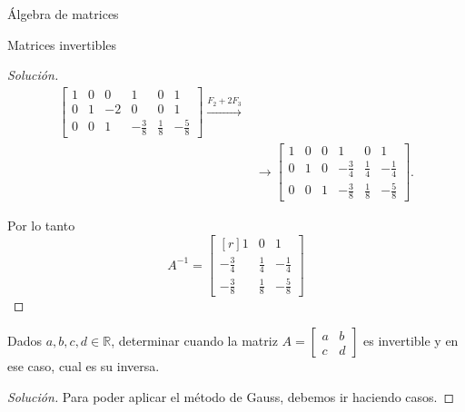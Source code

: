 \begin{chapter}{\'Algebra de matrices}
\begin{section}{Matrices invertibles}
\begin{proof}[Solución]
\begin{align*}
                \left[\begin{array}{rrr|rrr}    1&0&0&1&0&1\\ 0&1&-2&0&0&1 \\ 0&0&1&-\frac38&\frac18&-\frac58 \end{array}\right]
                \stackrel{F_2+2F_3}{\longrightarrow} \\
                &\longrightarrow
                \left[\begin{array}{rrr|rrr}    1&0&0&1&0&1\\ 0&1&0&-\frac34&\frac14&-\frac14 \\ 0&0&1&-\frac38&\frac18&-\frac58 \end{array}\right].
                \end{align*}
                
                Por lo tanto 
                \begin{equation*}
                A^{-1} =     \begin{bmatrix*}[r]    1&0&1\\ -\frac34&\frac14&-\frac14 \\ -\frac38&\frac18&-\frac58 \end{bmatrix*}
                \end{equation*}
            \end{proof}
            
            \begin{ejemplo*}\label{inv-2x2-0}
                Dados $a,b,c,d \in \mathbb R$, determinar cuando la matriz $A = \begin{bmatrix*} a&b\\c&d\end{bmatrix*}$  es invertible y en ese caso,  cual es su inversa. 
            \end{ejemplo*}
            \begin{proof}[Solución] Para poder aplicar el método de Gauss, debemos ir haciendo casos. 
                

\end{proof}
\end{section}
\end{chapter}

